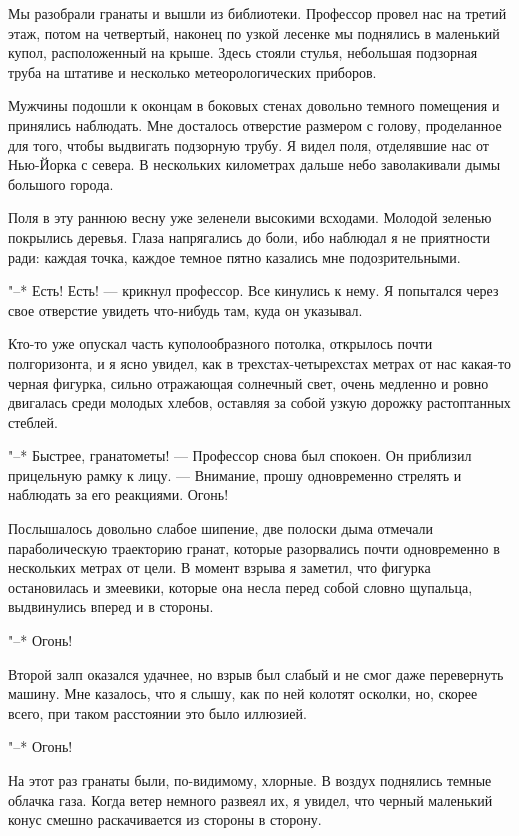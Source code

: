 Мы разобрали гранаты и вышли из библиотеки.  Профессор  провел  нас  на
третий этаж, потом на четвертый, наконец по узкой лесенке мы  поднялись  в
маленький купол, расположенный на крыше. Здесь  стояли  стулья,  небольшая
подзорная труба на штативе и несколько метеорологических приборов.

Мужчины подошли к оконцам в боковых стенах довольно темного помещения и
принялись  наблюдать.  Мне  досталось   отверстие   размером   с   голову,
проделанное для того, чтобы  выдвигать  подзорную  трубу.  Я  видел  поля,
отделявшие нас от Нью-Йорка с севера. В нескольких километрах дальше  небо
заволакивали дымы большого города.

Поля в эту раннюю весну уже зеленели высокими всходами. Молодой зеленью
покрылись деревья. Глаза напрягались до боли, ибо наблюдал я не приятности
ради: каждая точка, каждое темное пятно казались мне подозрительными.

"--* Есть! Есть! --- крикнул профессор. Все кинулись  к  нему.  Я  попытался
через свое отверстие увидеть что-нибудь там, куда он указывал.

Кто-то уже  опускал  часть  куполообразного  потолка,  открылось  почти
полгоризонта, и я ясно увидел, как в трехстах-четырехстах  метрах  от  нас
какая-то черная фигурка, сильно отражающая солнечный свет, очень  медленно
и ровно двигалась среди молодых хлебов, оставляя за  собой  узкую  дорожку
растоптанных стеблей.

"--* Быстрее, гранатометы! --- Профессор снова  был  спокоен.  Он  приблизил
прицельную рамку  к  лицу.  ---  Внимание,  прошу  одновременно  стрелять  и
наблюдать за его реакциями. Огонь!

Послышалось  довольно  слабое  шипение,  две  полоски   дыма   отмечали
параболическую траекторию гранат, которые разорвались почти одновременно в
нескольких метрах  от  цели.  В  момент  взрыва  я  заметил,  что  фигурка
остановилась и змеевики, которые она несла перед  собой  словно  щупальца,
выдвинулись вперед и в стороны.

"--* Огонь!

Второй залп оказался удачнее, но  взрыв  был  слабый  и  не  смог  даже
перевернуть машину. Мне казалось, что я слышу, как по ней колотят осколки,
но, скорее всего, при таком расстоянии это было иллюзией.

"--* Огонь!

На этот раз гранаты были,  по-видимому,  хлорные.  В  воздух  поднялись
темные облачка газа. Когда ветер немного развеял их, я увидел, что  черный
маленький конус смешно раскачивается из стороны в сторону.

